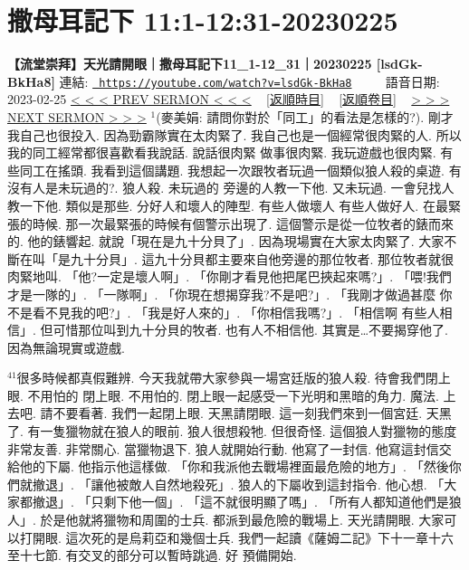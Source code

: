 \documentclass{book}
\begin{document}
\section{撒母耳記下 11:1-12:31-20230225}
\label{sec:lsdGk_BkHa8}
\textbf{【流堂崇拜】天光請開眼｜撒母耳記下11\_1-12\_31｜20230225 [lsdGk-BkHa8]}
\newline
\newline
連結: \href{https://youtube.com/watch?v=lsdGk-BkHa8}{\texttt{ https://youtube.com/watch?v=lsdGk-BkHa8}} ~~~~ 語音日期: 2023-02-25 
\newline
\newline
\hyperref[sec:4Dll86a7b18]{\small{< < < PREV SERMON < < <}}
~
\hyperref[sec:index_chronic]{\small{[返順時目]}}
~
\hyperref[sec:index_scriptual]{\small{[返順卷目]}}
~
\hyperref[sec:VfT5ldcLjqQ]{\small{> > > NEXT SERMON > > >}}
\newline
\newline
$^{1}$(麥美娟: 請問你對於「同工」的看法是怎樣的?).
剛才我自己也很投入.
因為勁霸隊實在太肉緊了.
我自己也是一個經常很肉緊的人.
所以我的同工經常都很喜歡看我說話.
說話很肉緊 做事很肉緊.
我玩遊戲也很肉緊.
有些同工在搖頭.
我看到這個講題.
我想起一次跟牧者玩過一個類似狼人殺的桌遊.
有沒有人是未玩過的?.
狼人殺.
未玩過的 旁邊的人教一下他.
又未玩過.
一會兒找人教一下他.
類似是那些.
分好人和壞人的陣型.
有些人做壞人 有些人做好人.
在最緊張的時候.
那一次最緊張的時候有個警示出現了.
這個警示是從一位牧者的錶而來的.
他的錶響起.
就說「現在是九十分貝了」.
因為現場實在大家太肉緊了.
大家不斷在叫「是九十分貝」.
這九十分貝都主要來自他旁邊的那位牧者.
那位牧者就很肉緊地叫.
「他?一定是壞人啊」.
「你剛才看見他把尾巴挾起來嗎?」.
「喂!我們才是一隊的」.
「一隊啊」.
「你現在想揭穿我?不是吧?」.
「我剛才做過甚麼 你不是看不見我的吧?」.
「我是好人來的」.
「你相信我嗎?」.
「相信啊 有些人相信」.
但可惜那位叫到九十分貝的牧者.
也有人不相信他.
其實是…不要揭穿他了.
因為無論現實或遊戲.

$^{41}$很多時候都真假難辨.
今天我就帶大家參與一場宮廷版的狼人殺.
待會我們閉上眼.
不用怕的 閉上眼.
不用怕的.
閉上眼一起感受一下光明和黑暗的角力.
魔法.
上去吧.
請不要看著.
我們一起閉上眼.
天黑請閉眼.
這一刻我們來到一個宮廷.
天黑了.
有一隻獵物就在狼人的眼前.
狼人很想殺牠.
但很奇怪.
這個狼人對獵物的態度非常友善.
非常關心.
當獵物退下.
狼人就開始行動.
他寫了一封信.
他寫這封信交給他的下屬.
他指示他這樣做.
「你和我派他去戰場裡面最危險的地方」.
「然後你們就撤退」.
「讓他被敵人自然地殺死」.
狼人的下屬收到這封指令.
他心想.
「大家都撤退」.
「只剩下他一個」.
「這不就很明顯了嗎」.
「所有人都知道他們是狼人」.
於是他就將獵物和周圍的士兵.
都派到最危險的戰場上.
天光請開眼.
大家可以打開眼.
這次死的是烏莉亞和幾個士兵.
我們一起讀《薩姆二記》下十一章十六至十七節.
有交叉的部分可以暫時跳過.
好 預備開始.
\end{document}
